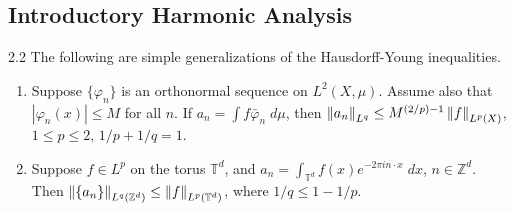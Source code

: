 \documentclass{article}
\begin{document}
\subsection{Introductory Harmonic Analysis}

\begin{prb}{2.2}
	The following are simple generalizations of the Hausdorff-Young inequalities. \vspace{-0.25cm} 
	\begin{enumerate}[itemsep =-2pt,label = (\alph{*})]
		\item Suppose $\{\varphi_{n}\}$ is an orthonormal sequence on $L^{2}(X, \mu)$. Assume also that $|\varphi_{n}(x)| \leq M$ for all $n$. If $a_{n} = \int f\bar{\varphi}_{n}\;d\mu$, then $\left\Vert a_{n} \right\Vert_{L^{q}} \leq M^{(2/p) - 1}\left\Vert f \right\Vert_{L^{p}(X)}$, $1 \leq p \leq 2$, $1/p + 1/q = 1$. 
		\item Suppose $f \in L^{p}$ on the torus $\mathbb{T}^{d}$, and $a_{n}= \int_{\mathbb{T}^{d}}f(x)e^{-2\pi i n \cdot x}\;dx$, $n \in \mathbb{Z}^{d}$. Then $\left\Vert \{a_{n}\} \right\Vert_{L^{q}(\mathbb{Z}^{d})} \leq \left\Vert f \right\Vert_{L^{p}(\mathbb{T}^{d})}$, where $1/q \leq 1 - 1/p$. 
	\end{enumerate}
\end{prb}
\end{document}

